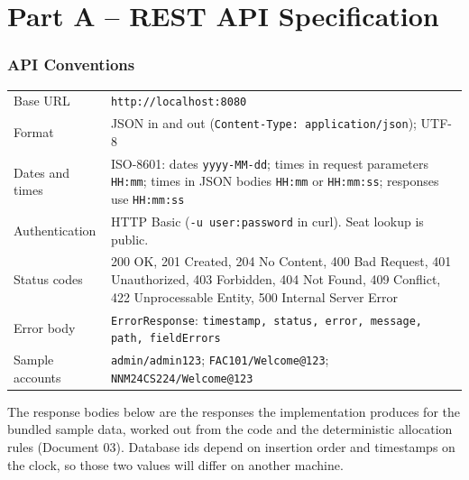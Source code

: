 \documentclass[11pt,a4paper]{article}
\begin{document}

\newpage
\tableofcontents
\newpage
{}

\part*{Part A -- REST API Specification}

\section{API Conventions}
\begin{tabularx}{\linewidth}{|L{3.4cm}|X|}
\hline\headrow{} & \\\hline
Base URL & \texttt{http://localhost:8080}\\\hline
Format & JSON in and out (\texttt{Content-Type: application/json}); UTF-8\\\hline
Dates and times & ISO-8601: dates \texttt{yyyy-MM-dd}; times in request parameters \texttt{HH:mm}; times in JSON bodies \texttt{HH:mm} or \texttt{HH:mm:ss}; responses use \texttt{HH:mm:ss}\\\hline
Authentication & HTTP Basic (\texttt{-u user:password} in curl). Seat lookup is public.\\\hline
Status codes & 200 OK, 201 Created, 204 No Content, 400 Bad Request, 401 Unauthorized, 403 Forbidden, 404 Not Found, 409 Conflict, 422 Unprocessable Entity, 500 Internal Server Error\\\hline
Error body & \texttt{ErrorResponse}: \texttt{timestamp, status, error, message, path, fieldErrors}\\\hline
Sample accounts & \texttt{admin/admin123}; \texttt{FAC101/Welcome@123}; \texttt{NNM24CS224/Welcome@123}\\\hline
\end{tabularx}

\begin{notebox}
The response bodies below are the responses the implementation produces for the bundled sample data, worked out from the code and the deterministic allocation rules (Document 03). Database ids depend on insertion order and timestamps on the clock, so those two values will differ on another machine.
\end{notebox}
\end{document}
